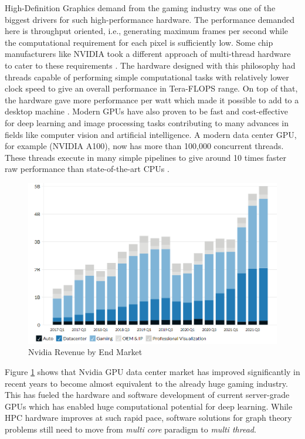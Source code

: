 High-Definition Graphics demand from the gaming industry was one of the biggest drivers for such high-performance hardware. The performance demanded here is throughput oriented, i.e., generating maximum frames per second while the computational requirement for each pixel is sufficiently low.
Some chip manufacturers like NVIDIA took a different approach of multi-thread hardware  to cater to these requirements \cite{GPUs_and_gaming}.
The hardware designed with this philosophy had threads capable of performing simple computational tasks with relatively lower clock speed to give an overall performance in Tera-FLOPS range. On top of that, the hardware gave more performance per watt which made it possible to add to a desktop machine \cite{ppw_gpu_vs_cpu}.
Modern GPUs have also proven to be fast and cost-effective for deep learning and image processing tasks contributing to many advances in fields like computer vision and artificial intelligence. A modern data center GPU, for example (NVIDIA A100), now has more than 100,000 concurrent threads. These threads execute in many simple pipelines to give around 10 times faster raw performance than state-of-the-art CPUs \cite{GPU_book_wen-mei}.
\begin{figure}
    \includegraphics[width=\textwidth]{fig/Nvidia-revenue-by-end-market.png}
    \caption{Nvidia Revenue by End Market}
    \label{fig:Nvidia-revenue}
\end{figure}

Figure \ref{fig:Nvidia-revenue} shows that Nvidia GPU data center market has improved significantly in recent years to become almost equivalent to the already huge gaming industry.
This has fueled the hardware and software development of current server-grade GPUs which has enabled huge computational potential for deep learning.
While HPC hardware improves at such rapid pace, software solutions for graph theory problems still need to move from \textit{multi core} paradigm to \textit{multi thread}.

